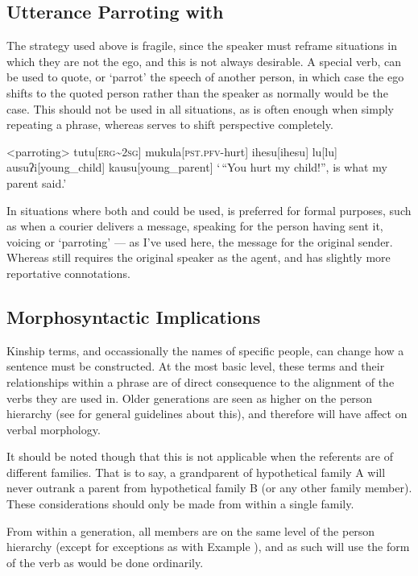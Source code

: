 \documentclass[openany, 12pt, b5paper, draft]{memoir}
\begin{document}
\subsection{Utterance Parroting with }
The strategy used above is fragile, since the speaker must reframe situations in which they are not the ego, and this is not always desirable. A special verb,  can be used to quote, or `parrot' the speech of another person, in which case the ego shifts to the quoted person rather than the speaker as normally would be the case. This should not be used in all situations, as  is often enough when simply repeating a phrase, whereas  serves to shift perspective completely.

\ex<parroting>
\begingl
tutu[\textsc{erg\textasciitilde 2sg}]
mukula[\textsc{pst.pfv-}hurt]
ihesu[ihesu]
lu[lu]
ausuʔi[young\_child]
kausu[young\_parent]
\glft `\,``You hurt my child!'', is what my parent said.'
\endgl
\xe

In situations where both  and  could be used,  is preferred for formal purposes, such as when a courier delivers a message, speaking for the person having sent it, voicing or `parroting' --- as I've used here, the message for the original sender. Whereas  still requires the original speaker as the agent, and has slightly more reportative connotations.

\subsection{Morphosyntactic Implications}
Kinship terms, and occassionally the names of specific people, can change how a sentence must be constructed. At the most basic level, these terms and their relationships within a phrase are of direct consequence to the alignment of the verbs they are used in. Older generations are seen as higher on the person hierarchy (see  for general guidelines about this), and therefore will have affect on verbal morphology.

It should be noted though that this is not applicable when the referents are of different families. That is to say, a grandparent of hypothetical family A will never outrank a parent from hypothetical family B (or any other family member). These considerations should only be made from within a single family.

From within a generation, all members are on the same level of the person hierarchy (except for exceptions as with Example ), and as such will use the form of the verb as would be done ordinarily.
\end{document}
